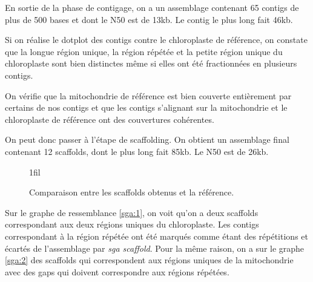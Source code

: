 \documentclass[a4paper]{article}
\makeatletter
\newcommand*{\centerfloat}{%
  \parindent \z@
  \leftskip \z@ \@plus 1fil \@minus \textwidth
  \rightskip\leftskip
  \parfillskip \z@skip}
\makeatother
\begin{document}
\label{sga} En sortie de la phase de contigage, on a un assemblage contenant 65 contigs de plus de 500 bases et dont le N50 est de 13kb. Le contig le plus long fait 46kb. 

Si on réalise le dotplot des contigs contre le chloroplaste de référence, on constate que la longue région unique, la région répétée et la petite région unique du chloroplaste sont bien distinctes même si elles ont été fractionnées en plusieurs contigs. 

On vérifie que la mitochondrie de référence est bien couverte entièrement par certains de nos contigs et que les contigs s'alignant sur la mitochondrie et le chloroplaste de référence ont des couvertures cohérentes.

On peut donc passer à l'étape de scaffolding. On obtient un assemblage final contenant 12 scaffolds, dont le plus long fait 85kb. Le N50 est de 26kb. 

\begin{figure}[H]
\centerfloat

 \hspace{5mm}

\label{sha}
\caption{Comparaison entre les scaffolds obtenus et la référence. }
\end{figure}

Sur le graphe de ressemblance \ref{sga:1}, on voit qu'on a deux scaffolds correspondant aux deux régions uniques du chloroplaste. Les contigs correspondant à la région répétée ont été marqués comme étant des répétitions et écartés de l'assemblage par \textit{sga scaffold}. Pour la même raison, on a sur le graphe \ref{sga:2} des scaffolds qui correspondent aux régions uniques de la mitochondrie avec des gaps qui doivent correspondre aux régions répétées. 
\end{document}
